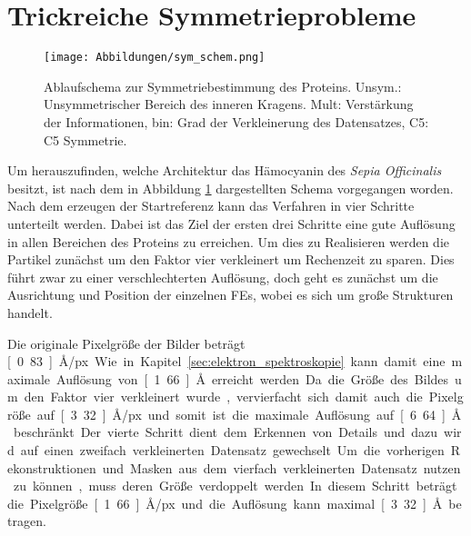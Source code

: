 \section{Trickreiche Symmetrieprobleme} %
\label{sec:symmetrieproblem}

\begin{figure}
	\texttt{[image: Abbildungen/sym\_schem.png]}
	\caption[Ablaufschema zur Symmetriebestimmung]{Ablaufschema zur Symmetriebestimmung des Proteins. Unsym.: Unsymmetrischer Bereich des inneren Kragens. Mult: Verstärkung der Informationen, bin: Grad der Verkleinerung des Datensatzes, C5: C5 Symmetrie.}
	\label{symmi}
\end{figure}

Um herauszufinden, welche Architektur das Hämocyanin des \textit{Sepia Officinalis} besitzt, ist nach dem in Abbildung \ref{symmi} dargestellten Schema vorgegangen worden.
Nach dem erzeugen der Startreferenz kann das Verfahren in vier Schritte unterteilt werden.
Dabei ist das Ziel der ersten drei Schritte eine gute Auflösung in allen Bereichen des Proteins zu erreichen.
Um dies zu Realisieren werden die Partikel zunächst um den Faktor vier verkleinert um Rechenzeit zu sparen.
Dies führt zwar zu einer verschlechterten Auflösung, doch geht es zunächst um die Ausrichtung und Position der einzelnen FEs, wobei es sich um große Strukturen handelt.

Die originale Pixelgröße der Bilder beträgt \unit[0.83]{\AA/px}.
Wie in Kapitel \ref{sec:elektron_spektroskopie} kann damit eine maximale Auflösung von \unit[1.66]{\AA} erreicht werden.
Da die Größe des Bildes um den Faktor vier verkleinert wurde, vervierfacht sich damit auch die Pixelgröße auf \unit[3.32]{\AA/px} und somit ist die maximale Auflösung auf \unit[6.64]{\AA} beschränkt.

Der vierte Schritt dient dem Erkennen von Details und dazu wird auf einen zweifach verkleinerten Datensatz gewechselt.
Um die vorherigen Rekonstruktionen und Masken aus dem vierfach verkleinerten Datensatz nutzen zu können, muss deren Größe verdoppelt werden.
In diesem Schritt beträgt die Pixelgröße \unit[1.66]{\AA/px} und die Auflösung kann maximal \unit[3.32]{\AA} betragen.

